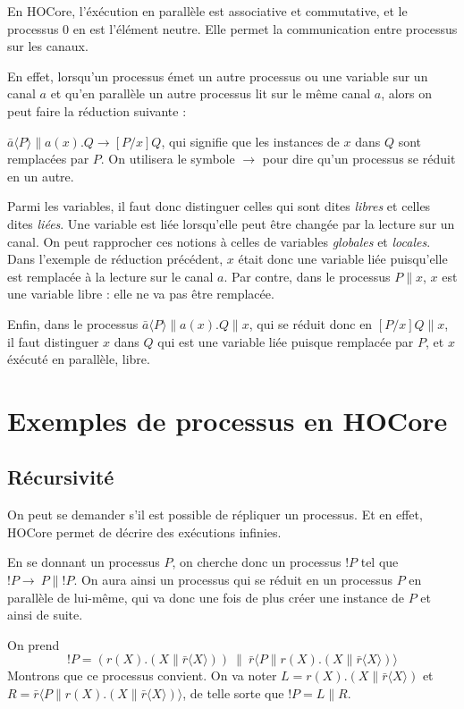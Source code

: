 \documentclass[11pt]{article}
\begin{document}
En HOCore, l'éxécution en parallèle est associative et commutative, et le processus $0$ en est l'élément neutre. Elle permet la communication entre processus sur les canaux.

En effet, lorsqu'un processus émet un autre processus ou une variable sur un canal $a$ et qu'en parallèle un autre processus lit sur le même canal $a$, alors on peut faire la réduction suivante :

$\bar{a}\langle P\rangle\|a(x).Q \rightarrow [P/x]Q$, qui signifie que les instances de $x$ dans $Q$ sont remplacées par $P$. On utilisera le symbole $\rightarrow$ pour dire qu'un processus se réduit en un autre.

Parmi les variables, il faut donc distinguer celles qui sont dites \textit{libres} et celles dites \textit{liées}. 
Une variable est liée lorsqu'elle peut être changée par la lecture sur un canal. On peut rapprocher ces notions à celles de variables \textit{globales} et \textit{locales}.
Dans l'exemple de réduction précédent, $x$ était donc une variable liée puisqu'elle est remplacée à la lecture sur le canal $a$. Par contre, dans le processus $P\|x$, $x$ est une variable libre : elle ne va pas être remplacée. 

Enfin, dans le processus $\bar{a}\langle P\rangle\|a(x).Q\|x$,  qui se réduit donc en $[P/x]Q\|x$, il faut distinguer $x$ dans $Q$ qui est une variable liée puisque remplacée par $P$, et $x$ éxécuté en parallèle, libre. %



\section{Exemples de processus en HOCore}
\subsection{Récursivité}

On peut se demander s'il est possible de répliquer un processus. Et en effet, HOCore permet de décrire des exécutions infinies.

En se donnant un processus $P$, on cherche donc un processus $!P$ tel que $!P\rightarrow\ P\|!P$. On aura ainsi un processus qui se réduit en un processus $P$ en parallèle de lui-même, qui va donc une fois de plus créer une instance de $P$ et ainsi de suite.

On prend $$!P = (r(X).(X\|\bar{r}\langle X\rangle))\ \|\ \bar{r}\langle P\|r(X).(X\|\bar{r}\langle X\rangle)\rangle$$
Montrons que ce processus convient. On va noter $L = r(X).(X\|\bar{r}\langle X\rangle)$ et $R = \bar{r}\langle P\|r(X).(X\|\bar{r}\langle X\rangle)\rangle$, de telle sorte que $!P = L\|R$.
\end{document}
